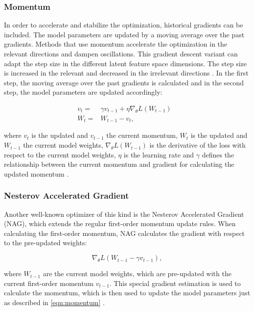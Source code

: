 \subsubsection{Momentum}
In order to accelerate and stabilize the optimization, historical gradients can be included. The model parameters are updated by a moving average over the past gradients. Methods that use momentum accelerate the optimization in the relevant directions and dampen oscillations. This gradient descent variant can adapt the step size in the different latent feature space dimensions. The step size is increased in the relevant and decreased in the irrelevant directions \cite{Ruder2016}. In the first step, the moving average over the past gradients is calculated and in the second step, the model parameters are updated accordingly:

    \begin{equation}
      \begin{aligned}
          v_{t} = & \gamma v_{t-1} +  \eta \nabla_{\theta}L(W_{t-1}) &\\
          W_{t} = &W_{t-1} - v_{t},
          \label{eqn:momentum}
      \end{aligned}
    \end{equation}

where $v_{t}$ is the updated and $v_{t-1}$ the current momentum, $W_{t}$ is the updated and $W_{t-1}$ the current model weights, $\nabla_{\theta}L(W_{t-1})$ is the derivative of the loss with respect to the current model weights, $\eta$ is the learning rate and $\gamma$ defines the relationship between the current momentum and gradient for calculating the updated momentum \cite{Ruder2016}.

    
\subsubsection{Nesterov Accelerated Gradient}
Another well-known optimizer of this kind is the Nesterov Accelerated Gradient (NAG), which extends the regular first-order momentum update rules. When calculating the first-order momentum, NAG calculates the gradient with respect to the pre-updated weights: 

\begin{equation}
    \nabla_{\theta}L( W_{t-1} - \gamma v_{t-1}),
\end{equation}
    
where $W_{t-1}$ are the current model weights, which are pre-updated with the current first-order momentum $v_{t-1}$. This special gradient estimation is used to calculate the momentum, which is then used to update the model parameters just as described in \ref{eqn:momentum} \cite{Ruder2016}.

